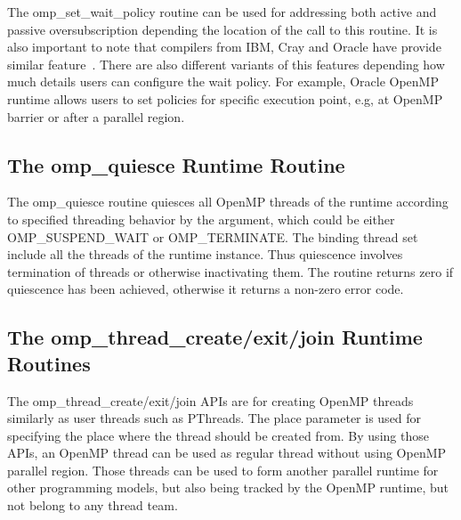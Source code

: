 The {\sf omp\_set\_wait\_policy} routine can be used for addressing both active and passive oversubscription depending the location of the call to 
this routine. It is also important to note that compilers from IBM, Cray and Oracle have provide similar feature~\cite{ibmwait,craywait,oraclewait}.
There are also different variants of this features depending how much details users can configure
the wait policy. For example, Oracle OpenMP runtime allows users to set policies for specific execution point, e.g, at OpenMP 
barrier or after a parallel region. 

\subsection{The {\sf omp\_quiesce} Runtime Routine}
The {\sf omp\_quiesce} routine quiesces all OpenMP threads of the runtime according to 
specified threading behavior by the argument, which could be either OMP\_SUSPEND\_WAIT or OMP\_TERMINATE. The binding thread set include
all the threads of the runtime instance. 
Thus quiescence involves termination of threads or otherwise inactivating them. 
The routine returns zero if quiescence has been achieved, otherwise it returns a non-zero error code.



\subsection{The {\sf omp\_thread\_create/exit/join} Runtime Routines}

The {\sf omp\_thread\_create/exit/join} APIs are for creating OpenMP threads similarly as user threads such 
as PThreads. The {\sf place} parameter is used for specifying the place where the thread should be created from.  
By using those APIs, an OpenMP thread
can be used as regular thread without using OpenMP parallel region. Those threads can be used to form another parallel runtime for other programming
models, but also being tracked by the OpenMP runtime, but not belong to any thread team. 


